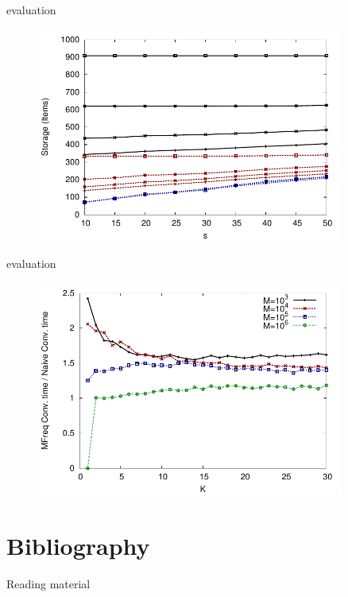 \begin{frame}{\FreqMF evaluation}

\begin{figure}
\includegraphics[width=0.9\textwidth]{figs/12/msgstorage.pdf}
\end{figure}

\end{frame}

\begin{frame}{\FreqMF evaluation}

\begin{figure}
\includegraphics[width=0.9\textwidth]{figs/12/msgratio.pdf}
\end{figure}

\end{frame}


\section{Bibliography}

\begin{frame}{Reading material}

{\footnotesize
\BIL
\item {}
\EIL
}

\invisible{{\tiny

 
}}

\end{frame}

